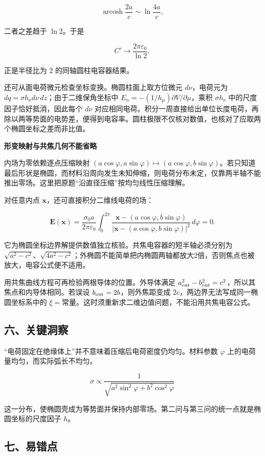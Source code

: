 \documentclass[12pt,a4paper,UTF8]{ctexart}
\begin{document}
\[\operatorname{arcosh}\frac{2a}{c}\sim\ln\frac{4a}{c},\]

二者之差趋于 \(\ln2\)。于是

\[C'\to\frac{2\pi\varepsilon_0}{\ln2},\]

正是半径比为 \(2\) 的同轴圆柱电容器结果。

还可从面电荷微元检查坐标变换。椭圆柱面上取方位微元 \(d\nu\)，电荷元为
\(dq=\sigma h_\nu d\nu\,dz\)；由于二维保角坐标中
\(E_n=-(1/h_\mu)\partial V/\partial\mu\)，乘积 \(\sigma h_\nu\)
中的尺度因子恰好抵消，因此每个 \(d\nu\)
对应相同电荷。积分一周直接给出单位长度电荷，再除以两等势面的电势差，便得到电容率。圆柱极限不仅核对数值，也核对了应取两个椭圆坐标之差而非比值。

\textbf{形变映射与共焦几何不能省略}

内场为零依赖逐点压缩映射
\((a\cos\varphi,a\sin\varphi)\mapsto(a\cos\varphi,b\sin\varphi)\)。若只知道最后形状是椭圆，而材料沿周向发生未知伸缩，则电荷分布未定，仅靠两半轴不能推出零场。这里把原题``沿直径压缩''按均匀线性压缩理解。

对任意内点 \(\bm x\)，还可直接积分二维线电荷的场：

\[\bm E(\bm x)=\frac{\sigma_0a}{2\pi\varepsilon_0}
\int_0^{2\pi}\frac{\bm x-(a\cos\varphi,b\sin\varphi)}
{|\bm x-(a\cos\varphi,b\sin\varphi)|^2}\,d\varphi=0.\]

它为椭圆坐标边界解提供数值独立核验。共焦电容器的短半轴必须分别为
\(\sqrt{a^2-c^2}\)、\(\sqrt{4a^2-c^2}\)；外椭圆不能简单把内椭圆两轴都放大2倍，否则焦点也被放大，电容公式便不适用。

用共焦曲线方程可再检验两根导体的位置。外导体满足
\(a_{\rm out}^2-b_{\rm out}^2=c^2\)，所以其焦点和内导体相同。若误设
\(b_{\rm out}=2b\)，则外焦距变成
\(2c\)，两边界无法写成同一椭圆坐标系中的
\(\xi=\text{常量}\)。这时须重新求二维边值问题，不能沿用共焦电容公式。

\subsection{六、关键洞察}\label{ux516dux5173ux952eux6d1eux5bdf-4}

``电荷固定在绝缘体上''并不意味着压缩后电荷密度仍均匀。材料参数
\(\varphi\) 上的电荷量均匀，而实际弧长不均匀。

\[\sigma\propto\frac1{\sqrt{a^2\sin^2\varphi+b^2\cos^2\varphi}}\]

这一分布，使椭圆壳成为等势面并保持内部零场。第二问与第三问的统一点就是椭圆坐标的尺度因子
\(h\)。

\subsection{七、易错点}\label{ux4e03ux6613ux9519ux70b9-4}
\end{document}
